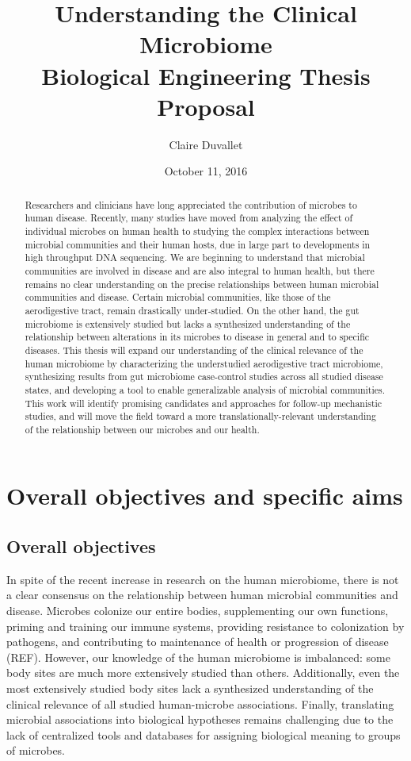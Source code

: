 \documentclass[12pt]{article}
\title{Understanding the Clinical Microbiome \\ Biological Engineering Thesis Proposal}
\author{Claire Duvallet}
\date{October 11, 2016}
\begin{document}
\maketitle
\newpage
\tableofcontents

\begin{abstract}
Researchers and clinicians have long appreciated the contribution of microbes
to human disease. Recently, many studies have moved from analyzing the effect of
individual microbes on human health to studying the complex interactions between
microbial communities and their human hosts, due in large part to developments
in high throughput DNA sequencing. We are beginning to understand
that microbial communities are involved in disease and are also
integral to human health,
but there remains no clear understanding on the precise relationships between human 
microbial communities and disease. Certain microbial communities, like those
of the aerodigestive tract, remain drastically under-studied. On the other hand,
the gut microbiome is extensively studied but lacks
a synthesized understanding of the relationship between alterations in its
microbes to disease in general and to specific diseases.
This thesis will expand our understanding of the clinical relevance
of the human microbiome by characterizing the 
understudied aerodigestive tract microbiome,
synthesizing results from gut microbiome case-control studies across
all studied disease states, and developing a tool to enable generalizable analysis
of microbial communities. This work will identify promising candidates and approaches
for follow-up mechanistic studies, and will move the field toward a more
translationally-relevant understanding of the relationship between our microbes
and our health.



\end{abstract}
\newpage

\section{Overall objectives and specific aims}
\subsection{Overall objectives}
In spite of the recent increase in research on the human 
microbiome, there is not a clear consensus on the relationship between 
human microbial communities and disease. Microbes colonize our entire bodies,
supplementing our own functions, priming and training our immune 
systems, providing resistance to colonization 
by pathogens, and contributing to maintenance of health or progression of disease (REF). 
However, our knowledge of the human microbiome is imbalanced: some
body sites are much more extensively studied than others. 
Additionally, even the most extensively studied body sites lack a 
synthesized understanding of the clinical relevance of all studied human-microbe associations. 
Finally, translating microbial associations into biological hypotheses
remains challenging due to the lack of centralized tools and databases
for assigning biological meaning to groups of microbes.
\end{document}
